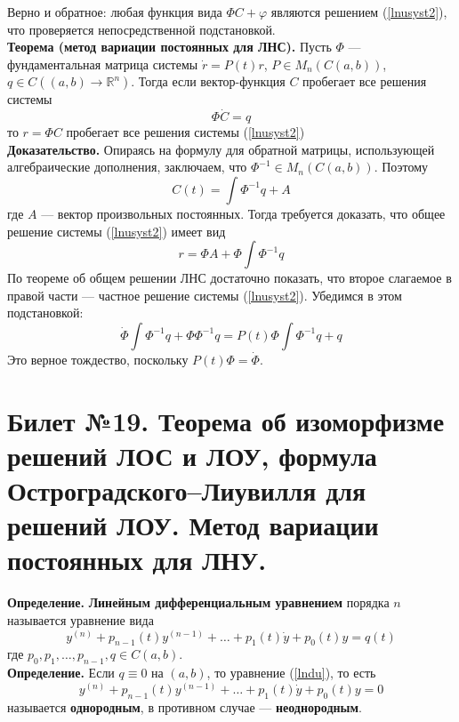 \documentclass{article}
\begin{document}
Верно и обратное: любая функция вида $\Phi C + \varphi$ являются решением (\ref{lnusyst2}), что проверяется непосредственной подстановкой.\\

\noindent \textbf{Теорема (метод вариации постоянных для ЛНС).} Пусть $\Phi$ --- фундаментальная матрица системы $\dot{r} = P(t)r$, $P \in M_n(C(a,b))$, $q \in C((a,b) \to \mathbb{R}^n)$. Тогда если вектор-функция $C$ пробегает все решения системы
\begin{equation*}
    \Phi\dot{C} = q
\end{equation*}
то $r = \Phi C$ пробегает все решения системы (\ref{lnusyst2})\\

\noindent \textbf{Доказательство.} Опираясь на формулу для обратной матрицы, использующей алгебраические дополнения, заключаем, что $\Phi^{-1} \in M_n(C(a,b))$. Поэтому
\begin{equation*}
    C(t) = \int \Phi^{-1}q + A
\end{equation*}
где $A$ --- вектор произвольных постоянных. Тогда требуется доказать, что общее решение системы (\ref{lnusyst2}) имеет вид
\begin{equation*}
    r = \Phi A + \Phi \int \Phi^{-1}q
\end{equation*}
По теореме об общем решении ЛНС достаточно показать, что второе слагаемое в правой части --- частное решение системы (\ref{lnusyst2}). Убедимся в этом подстановкой:
\begin{equation*}
    \dot{\Phi}\int \Phi^{-1}q + \Phi\Phi^{-1}q = P(t)\Phi \int \Phi^{-1}q + q
\end{equation*}
Это верное тождество, поскольку $P(t)\Phi = \dot{\Phi}$.

\section{Билет №19. Теорема об изоморфизме решений ЛОС и ЛОУ, формула Остроградского–Лиувилля для решений ЛОУ. Метод вариации постоянных для ЛНУ.}
\textbf{Определение.} \textbf{Линейным дифференциальным уравнением} порядка $n$ называется уравнение вида
\begin{equation}
    y^{(n)} + p_{n-1}(t)y^{(n - 1)} + \ldots + p_1(t)\dot{y} + p_0(t)y = q(t) \label{lndu}
\end{equation}
где $p_0, p_1, \ldots, p_{n-1}, q \in C(a,b)$.\\

\noindent \textbf{Определение.} Если $q \equiv 0$ на $(a,b)$, то уравнение (\ref{lndu}), то есть
\begin{equation}
    y^{(n)} + p_{n-1}(t)y^{(n - 1)} + \ldots + p_1(t)\dot{y} + p_0(t)y = 0 \label{lnou}
\end{equation}
называется \textbf{однородным}, в противном случае --- \textbf{неоднородным}.\\
\end{document}
